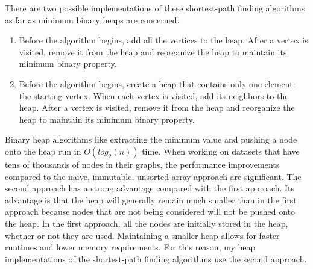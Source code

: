 \documentclass[conference]{IEEEtran}
\begin{document}
\newline
\newline
There are two possible implementations of these shortest-path finding algorithms as far as minimum binary heaps are concerned.
\begin{enumerate}
    \item Before the algorithm begins, add all the vertices to the heap. After a vertex is visited, remove it from the heap and reorganize the heap to maintain its minimum binary property.

    \item Before the algorithm begins, create a heap that contains only one element: the starting vertex. When each vertex is visited, add its neighbors to the heap. After a vertex is visited, remove it from the heap and reorganize the heap to maintain its minimum binary property.
    
\end{enumerate}
Binary heap algorithms like extracting the minimum value and pushing a node onto the heap run in $O(log_2(n))$ time. When working on datasets that have tens of thousands of nodes in their graphs, the performance improvements compared to the naive, immutable, unsorted array approach are significant.
\newline
\newline
The second approach has a strong advantage compared with the first approach. Its advantage is that the heap will generally remain much smaller than in the first approach because nodes that are not being considered will not be pushed onto the heap. In the first approach, all the nodes are initially stored in the heap, whether or not they are used. Maintaining a smaller heap allows for faster runtimes and lower memory requirements. For this reason, my heap implementations of the shortest-path finding algorithms use the second approach.
\end{document}
